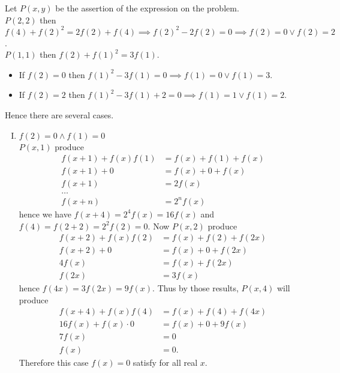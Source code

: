 
\begin{solusi}
    Let $P(x,y)$ be the assertion of the expression on the problem.\\
    $P(2,2)$ then $f(4)+f(2)^2 = 2f(2)+f(4) \implies f(2)^2-2f(2)=0 \implies f(2)=0 \vee f(2)=2$.\\
    $P(1,1)$ then $f(2)+f(1)^2 = 3f(1)$.
    \begin{itemize}
        \item If $f(2)=0$ then $f(1)^2-3f(1)=0 \implies f(1)=0 \vee f(1)=3$.
        \item If $f(2)=2$ then $f(1)^2-3f(1)+2=0 \implies f(1)=1 \vee f(1)=2$.
    \end{itemize}
    Hence there are several cases.
    \begin{enumerate}[I.]
        \item $f(2)=0 \wedge f(1)=0$\\
        $P(x,1)$ produce
        \begin{align*}
            f(x+1)+f(x)f(1) &= f(x)+f(1)+f(x)\\
            f(x+1) + 0 &= f(x) + 0 + f(x)\\
            f(x+1) &= 2f(x)\\
            \dots\\
            f(x+n) &= 2^nf(x)
        \end{align*}
        hence we have $f(x+4) = 2^4f(x) = 16f(x)$ and $f(4)=f(2+2)=2^2f(2)=0$. Now
        $P(x,2)$ produce
        \begin{align*}
            f(x+2)+f(x)f(2) &= f(x)+f(2)+f(2x)\\
            f(x+2) + 0 &= f(x) + 0 + f(2x)\\
            4f(x) &= f(x)+f(2x)\\
            f(2x) &= 3f(x)
        \end{align*}
        hence $f(4x) = 3f(2x)=9f(x)$. Thus by those results, $P(x,4)$ will produce
        \begin{align*}
            f(x+4)+f(x)f(4) &= f(x)+f(4)+f(4x)\\
            16f(x) + f(x) \cdot 0 &= f(x) + 0 + 9f(x)\\
            7f(x) &= 0\\
            f(x) &= 0.
        \end{align*}
        Therefore this case $f(x)=0$ satisfy for all real $x$.
        

\end{enumerate}
\end{solusi}
